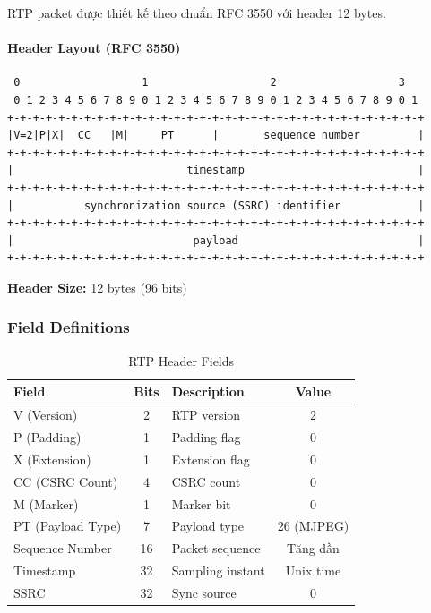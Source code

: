 \documentclass[a4paper,12pt]{article}
\begin{document}
\begin{samepage}
RTP packet được thiết kế theo chuẩn RFC 3550 với header 12 bytes.

\paragraph{Header Layout (RFC 3550)}

\begin{verbatim}
 0                   1                   2                   3
 0 1 2 3 4 5 6 7 8 9 0 1 2 3 4 5 6 7 8 9 0 1 2 3 4 5 6 7 8 9 0 1
+-+-+-+-+-+-+-+-+-+-+-+-+-+-+-+-+-+-+-+-+-+-+-+-+-+-+-+-+-+-+-+-+
|V=2|P|X|  CC   |M|     PT      |       sequence number         |
+-+-+-+-+-+-+-+-+-+-+-+-+-+-+-+-+-+-+-+-+-+-+-+-+-+-+-+-+-+-+-+-+
|                           timestamp                           |
+-+-+-+-+-+-+-+-+-+-+-+-+-+-+-+-+-+-+-+-+-+-+-+-+-+-+-+-+-+-+-+-+
|           synchronization source (SSRC) identifier            |
+-+-+-+-+-+-+-+-+-+-+-+-+-+-+-+-+-+-+-+-+-+-+-+-+-+-+-+-+-+-+-+-+
|                            payload                            |
+-+-+-+-+-+-+-+-+-+-+-+-+-+-+-+-+-+-+-+-+-+-+-+-+-+-+-+-+-+-+-+-+
\end{verbatim}

\textbf{Header Size:} 12 bytes (96 bits)
\end{samepage}

\subsubsection{Field Definitions}

\begin{table}[H]
\centering
\begin{tabular}{|l|c|l|c|}
\hline
\textbf{Field} & \textbf{Bits} & \textbf{Description} & \textbf{Value} \\
\hline
V (Version) & 2 & RTP version & 2 \\
P (Padding) & 1 & Padding flag & 0 \\
X (Extension) & 1 & Extension flag & 0 \\
CC (CSRC Count) & 4 & CSRC count & 0 \\
M (Marker) & 1 & Marker bit & 0 \\
PT (Payload Type) & 7 & Payload type & 26 (MJPEG) \\
Sequence Number & 16 & Packet sequence & Tăng dần \\
Timestamp & 32 & Sampling instant & Unix time \\
SSRC & 32 & Sync source & 0 \\
\hline
\end{tabular}
\caption{RTP Header Fields}
\end{table}
\end{document}
